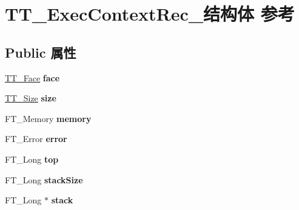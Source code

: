 \hypertarget{struct_t_t___exec_context_rec__}{}\section{T\+T\+\_\+\+Exec\+Context\+Rec\+\_\+结构体 参考}
\label{struct_t_t___exec_context_rec__}
\subsection*{Public 属性}
\begin{DoxyCompactItemize}
\item 
\mbox{\label{struct_t_t___exec_context_rec___adcce6cbc8fe23cad71af4238c056eab5}} 
\hyperlink{struct_t_t___face_rec__}{T\+T\+\_\+\+Face} {\bfseries face}
\item 
\mbox{\label{struct_t_t___exec_context_rec___a630680b65f57187b234058c07317676b}} 
\hyperlink{struct_t_t___size_rec__}{T\+T\+\_\+\+Size} {\bfseries size}
\item 
\mbox{\label{struct_t_t___exec_context_rec___a009291182576f93e0a38a8ca6947622c}} 
F\+T\+\_\+\+Memory {\bfseries memory}
\item 
\mbox{\label{struct_t_t___exec_context_rec___ad247870028ca02b7a9d8d704e936c00a}} 
F\+T\+\_\+\+Error {\bfseries error}
\item 
\mbox{\label{struct_t_t___exec_context_rec___a857cf9b28b03c0c4a5e0999d6fa53d0d}} 
F\+T\+\_\+\+Long {\bfseries top}
\item 
\mbox{\label{struct_t_t___exec_context_rec___a2bbcc0222a3445aa96e1f857e6b95768}} 
F\+T\+\_\+\+Long {\bfseries stack\+Size}
\item 
\mbox{\label{struct_t_t___exec_context_rec___ae2e5fe62a9160180ec5ad651fc398219}} 
F\+T\+\_\+\+Long $\ast$ {\bfseries stack}
\item 
\mbox{\label{struct_t_t___exec_context_rec___a12ef7842ca59c9f35411230ad689e23d}} 

\end{DoxyCompactItemize}

